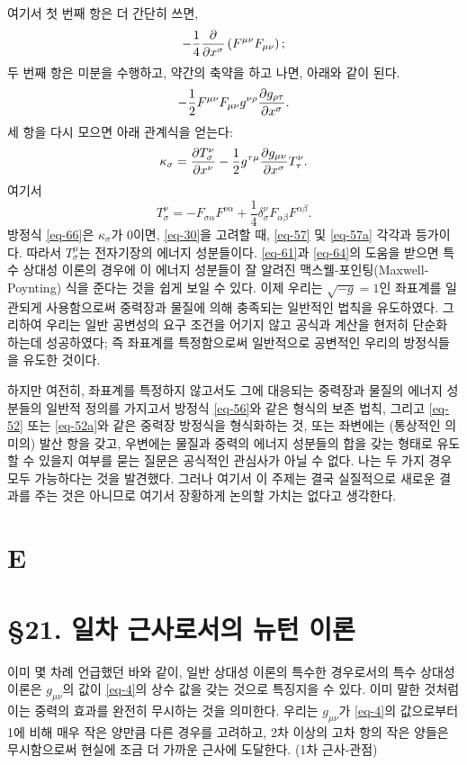 여기서 첫 번째 항은 더 간단히 쓰면,
\begin{equation*}
	-\frac{1}{4}{\frac{{\partial}{}}{{\partial}{x^\sigma}}}\left(F^{\mu\nu} F_{\mu\nu}\right);
\end{equation*}
두 번째 항은 미분을 수행하고, 약간의 축약을 하고 나면, 아래와 같이 된다.
\begin{equation*}
	-\frac{1}{2} F^{\mu\nu} F_{\mu\nu} g^{\nu\rho} {\frac{{\partial}{g_{\rho\tau}}}{{\partial}{x^\sigma}}}.
\end{equation*}
세 항을 다시 모으면 아래 관계식을 얻는다:
\begin{equation} \label{eq-66}
	\kappa_\sigma = {\frac{{\partial}{T_\sigma^\nu}}{{\partial}{x^\nu}}} - \frac{1}{2} g^{\tau\mu} {\frac{{\partial}{g_{\mu\nu}}}{{\partial}{x^\sigma}}} T_\tau^\nu.
\end{equation}
여기서
\begin{equation*}
	T_\sigma^\nu = -F_{\sigma\alpha} F^{\nu\alpha} + \frac{1}{4} \delta_\sigma^\nu F_{\alpha\beta} F^{\alpha\beta}.
\end{equation*}
방정식 \eqref{eq-66}은 $\kappa_\sigma$가 0이면, \eqref{eq-30}을 고려할 때, \eqref{eq-57} 및 \eqref{eq-57a} 각각과 등가이다. 따라서 $T_\sigma^\mu$는 전자기장의 에너지 성분들이다.
\eqref{eq-61}과 \eqref{eq-64}의 도움을 받으면 특수 상대성 이론의 경우에 이 에너지 성분들이  잘 알려진 맥스웰-포인팅(Maxwell-Poynting) 식을 준다는 것을 쉽게 보일 수 있다.
이제 우리는 $\sqrt{-g}=1$인 좌표계를 일관되게 사용함으로써 중력장과 물질에 의해 충족되는 일반적인 법칙을 유도하였다. 그리하여 우리는 일반 공변성의 요구 조건을 어기지 않고 공식과 계산을 현저히 단순화 하는데 성공하였다; 즉 좌표계를 특정함으로써 일반적으로 공변적인 우리의 방정식들을 유도한 것이다.

하지만 여전히, 좌표계를 특정하지 않고서도 그에 대응되는 중력장과 물질의 에너지 성분들의 일반적 정의를 가지고서 방정식 \eqref{eq-56}와 같은 형식의 보존 법칙, 그리고 \eqref{eq-52} 또는 \eqref{eq-52a}와 같은 중력장 방정식을 형식화하는 것, 또는 좌변에는 (통상적인 의미의) 발산 항을 갖고, 우변에는 물질과 중력의 에너지 성분들의 합을 갖는 형태로 유도할 수 있을지 여부를 묻는 질문은 공식적인 관심사가 아닐 수 없다. 나는 두 가지 경우 모두 가능하다는 것을 발견했다. 그러나 여기서 이 주제는 결국 실질적으로 새로운 결과를 주는 것은 아니므로 여기서 장황하게 논의할 가치는 없다고 생각한다.

\section*{E}
\section*{\S 21. 일차 근사로서의 뉴턴 이론}
이미 몇 차례 언급했던 바와 같이, 일반 상대성 이론의 특수한 경우로서의 특수 상대성 이론은 $g_{\mu\nu}$의 값이 \eqref{eq-4}의 상수 값을 갖는 것으로 특징지을 수 있다. 이미 말한 것처럼 이는 중력의 효과를 완전히 무시하는 것을 의미한다. 우리는 $g_{\mu\nu}$가 \eqref{eq-4}의 값으로부터 1에 비해 매우 작은 양만큼 다른 경우를 고려하고, 2차 이상의 고차 항의 작은 양들은 무시함으로써 현실에 조금 더 가까운 근사에 도달한다. (1차 근사-관점)

